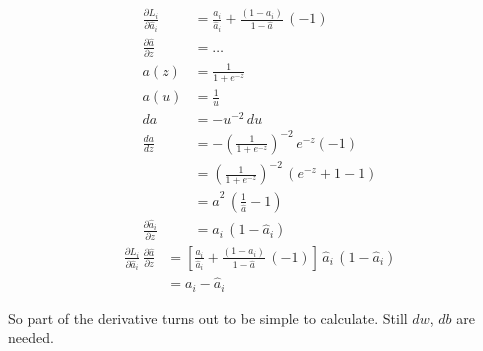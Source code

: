 \begin{align*}
  \frac{\partial L_i}{\partial \hat{a}_i} &= \frac{a_i}{\hat{a}_i} + \frac{(1-a_i)}{1-\hat{a}}\,(-1) \\
  \frac{\partial \hat{a}}{\partial z} &= \ldots  \label{eq:derZ}\\
  a(z)&= \frac{1}{1+e^{-z}}\\
  a(u)&=\frac{1}{u}\\
  da&=-u^{-2}\,du\\
  \frac{da}{dz}&=-\left(\frac{1}{1+e^{-z}}\right)^{-2}\,e^{-z}(-1)\\
  &=\left(\frac{1}{1+e^{-z}}\right)^{-2}\,(e^{-z} + 1 -1)\\
  &= \hat{a}^2\,(\frac{1}{\hat{a}} -1) \\
  \frac{\partial \hat{a}_i}{\partial z} &= \hat{a}_i\,(1-\hat{a}_i)
\end{align*}
\begin{align*}
  \frac{\partial L_i}{\partial \hat{a}_i}\,\frac{\partial \hat{a}}{\partial z} &= \left[ \frac{a_i}{\hat{a}_i} + \frac{(1-a_i)}{1-\hat{a}}\,(-1) \right]\,\hat{a}_i\,(1-\hat{a}_i)\\
  &= a_i - \hat{a}_i
\end{align*}

So part of the derivative turns out to be simple to calculate. Still $dw$, $db$ are needed.

